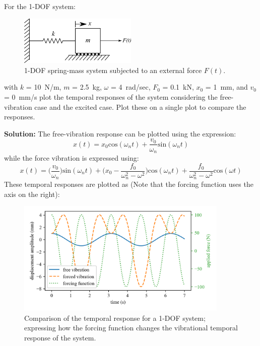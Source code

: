 \documentclass[12pt,letter]{article}
\begin{document}
	\begin{example}
		For the 1-DOF system:
		\begin{figure}[H]
			\centering
			\includegraphics[width=0.5\textwidth]{../figures/1-DOF-spring_mass_horizontal_forced.png}
			\caption{1-DOF spring-mass system subjected to an external force $F(t)$.}
		\end{figure}
		with $k$ = 10~N/m, $m$ = 2.5~kg, $\omega$ = 4~rad/sec, $F_0$ = 0.1~kN, $x_0$ = 1~mm, and $v_0$ = 0~mm/s plot the temporal responses of the system considering the free-vibration case and the excited case. Plot these on a single plot to compare the responses. 
					
		\noindent\textbf{Solution:} The free-vibration response can be plotted using the expression:
		\begin{equation}
			x(t) = x_0\text{cos}(\omega_n t) + \frac{v_0}{\omega_n}\text{sin}(\omega_n t)
		\end{equation}				
		while the force vibration is expressed using:
		\begin{equation}
			x(t) = \Big(\frac{v_0}{\omega_n}\Big)\text{sin}(\omega_n t) + \Big(x_0-\frac{f_0}{\omega_n^2-\omega^2}\Big)\text{cos}(\omega_n t) + \frac{f_0}{\omega_n^2-\omega^2}\text{cos}(\omega t)
		\end{equation}	
		These temporal responses are plotted as (Note that the forcing function uses the axis on the right):
		\begin{figure}[H]
			\centering
			\includegraphics[width=0.9\textwidth]{../figures/free_and_forced_temporal_response.png}
			\caption{Comparison of the temporal response for a 1-DOF system; expressing how the forcing function changes the vibrational  temporal response of the system.}
		\end{figure}	
	\end{example}
	
\end{document}
